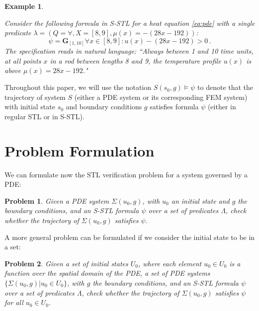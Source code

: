 \documentclass[letterpaper, 10 pt, conference]{ieeeconf/ieeeconf}
\newtheorem{problem}{Problem}
\newtheorem{example}{Example}
\newcommand{\Always}{\mathbf{G}}
\begin{document}
\begin{example}
    \label{ex:stl}

    Consider the following formula in S-STL for a heat equation \cref{eq:pde} with a single predicate
    $\lambda = (Q = \forall, X = [8, 9], \mu(x) = -(28x - 192))$:
%
    \begin{equation}
        \psi = \Always_{[1,10]} \forall x \in [8,9] : u(x) - (28x - 192) > 0 \,.
    \end{equation}
%
    The specification reads in natural language: ``Always between 1 and 10 time
    units, at all points $x$ in a rod between lengths 8 and 9, the temperature
    profile $u(x)$ is above $\mu(x) = 28x - 192$."

\end{example}

Throughout this paper, we will use the notation $S(s_0, g) \models \psi$ to denote
that the trajectory of system $S$ (either a PDE system or its corresponding FEM
system) with initial state $s_0$ and boundary conditions $g$ satisfies formula 
$\psi$ (either in regular STL or in S-STL).

\section{Problem Formulation}
\label{sec:problem_formulation}

We can formulate now the STL verification problem for a system governed by a
PDE:

\begin{problem}
\label{pr:stl}
    Given a PDE system $\Sigma(u_0, g)$, with $u_0$ an initial state and $g$
    the boundary conditions, and an S-STL formula $\psi$ over a set of
    predicates $\Lambda$, check whether the trajectory of $\Sigma(u_0, g)$
    satisfies $\psi$.
\end{problem}

A more general problem can be formulated if we consider the initial state to be
in a set:

\begin{problem}
\label{pr:stl_set}
    Given a set of initial states $U_0$, where each element $u_0 \in U_0$ is a
    function over the spatial domain of the PDE, a set of PDE systems
    $\{\Sigma(u_0, g) | u_0 \in U_0\}$, with $g$
    the boundary conditions, and an S-STL formula $\psi$ over a set of
    predicates $\Lambda$, check whether the trajectory of $\Sigma(u_0, g)$
    satisfies $\psi$ for all $u_0 \in U_0$.
\end{problem}
\end{document}

